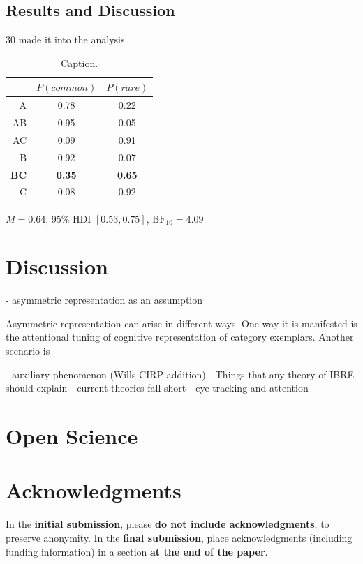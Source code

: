 \documentclass[10pt,letterpaper]{article}
\begin{document}
\subsection{Results and Discussion}

30 made it into the analysis

\begin{table}[H]
  \begin{center}
    \caption{Caption.\\}
    \label{tab:results-exp2}
    \vskip 0.12in
    \begin{tabular}{rcc}
      \hline
       & $P(common)$ & $P(rare)$ \\
      \hline
      A & 0.78 & 0.22  \\
      AB & 0.95 & 0.05 \\
      AC & 0.09 & 0.91 \\
      B & 0.92 & 0.07  \\
      \textbf{BC} & \textbf{0.35} & \textbf{0.65} \\
      C & 0.08 & 0.92 \\
    \end{tabular}
  \end{center}
\end{table}

$M = 0.64$, 95\% HDI $[0.53, 0.75]$, $\mathrm{BF}_{10} = 4.09$

\section{Discussion}

- asymmetric representation as an assumption

Asymmetric representation can arise in different ways.
One way it is manifested is the attentional tuning of cognitive representation of category exemplars.
Another scenario is

- auxiliary phenomenon (Wills CIRP addition)
- Things that any theory of IBRE should explain
- current theories fall short
- eye-tracking and attention

\section{Open Science}

\section{Acknowledgments}

In the \textbf{initial submission}, please \textbf{do not include
  acknowledgments}, to preserve anonymity.  In the \textbf{final submission},
place acknowledgments (including funding information) in a section \textbf{at
the end of the paper}.



\setlength{\bibleftmargin}{.125in}
\setlength{\bibindent}{-\bibleftmargin}


\end{document}

